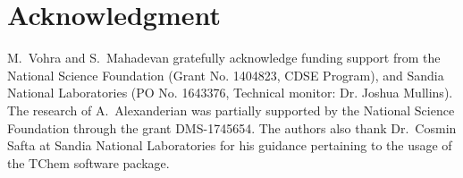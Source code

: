 \section*{Acknowledgment}

M.~Vohra and S.~Mahadevan gratefully acknowledge funding support from the
National Science Foundation (Grant No. 1404823, CDSE Program), and Sandia
National Laboratories (PO No. 1643376, Technical monitor: Dr. Joshua Mullins).
The research of A.~Alexanderian was partially supported by the
National Science Foundation through the grant DMS-1745654.  The authors also
thank Dr.~Cosmin Safta at Sandia National Laboratories for his guidance
pertaining to the usage of the TChem software package.
